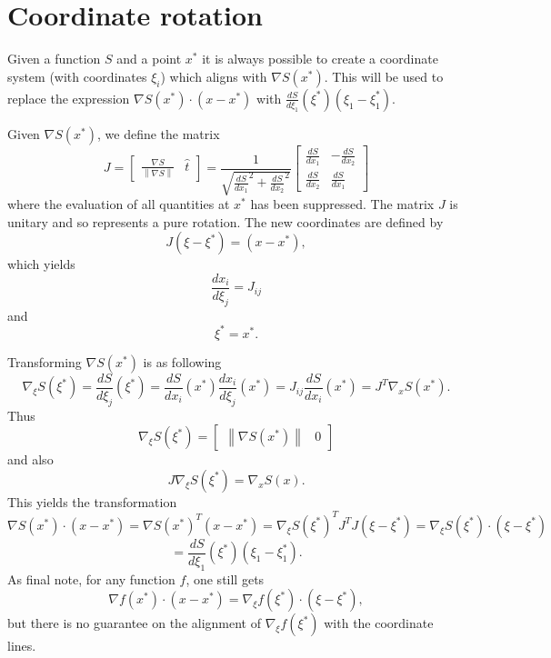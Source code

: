 \documentclass{article}
\newcommand{\norm}[1]{\left\lVert #1 \right\rVert}
\theoremstyle{plain}
\begin{document}
\section{Coordinate rotation}\label{sec_rotation}

Given a function $S$ and a point $x^*$ it is always possible to create a coordinate system (with coordinates $\xi_i$)
which aligns with $\nabla S(x^*)$.
This will be used to replace the expression $\nabla S(x^*)\cdot(x-x^*)$ with $\frac{dS}{d\xi_1}(\xi^*)(\xi_1-\xi_1^*)$.

Given $\nabla S(x^*)$, we define the matrix
\begin{equation}
	J =
	\begin{bmatrix}
		\frac{ \nabla S }{ \norm{\nabla S} } & \hat{t}
	\end{bmatrix}
	=
	\frac{1}{\sqrt{\frac{dS}{dx_1}^2 + \frac{dS}{dx_2}^2}}
	\begin{bmatrix}
		\frac{dS}{dx_1} & -\frac{dS}{dx_2} \\
		\frac{dS}{dx_2} & \frac{dS}{dx_1}
	\end{bmatrix}
\end{equation}
where the evaluation of all quantities at $x^*$ has been suppressed.
The matrix $J$ is unitary and so represents a pure rotation.
The new coordinates are defined by
\begin{equation}
	J(\xi-\xi^*) = (x-x^*),
\end{equation}
which yields
\begin{equation}
	\frac{dx_i}{d\xi_j} = J_{ij}
\end{equation}
and
\begin{equation}
	\xi^*=x^*.
\end{equation}

Transforming $\nabla S(x^*)$ is as following
\begin{equation}
	\nabla_\xi S(\xi^*) = \frac{dS}{d\xi_j}(\xi^*) = \frac{dS}{dx_i}(x^*)\frac{dx_i}{d\xi_j}(x^*) = J_{ij}\frac{dS}{dx_i}(x^*) = J^T\nabla_x S(x^*).
\end{equation}
Thus
\begin{equation}
	\nabla_\xi S(\xi^*) = 
	\begin{bmatrix}
		\norm{\nabla S(x^*)} & 0
	\end{bmatrix}
\end{equation}
and also
\begin{equation}
	J\nabla_\xi S(\xi^*) = \nabla_x S(x).
\end{equation}
This yields the transformation
\begin{equation*}
	\nabla S(x^*)\cdot(x-x^*) = \nabla S(x^*)^T(x-x^*) = \nabla_\xi S(\xi^*)^T J^T J(\xi-\xi^*) = \nabla_\xi S(\xi^*)\cdot(\xi-\xi^*)
\end{equation*}
\begin{equation}
	= \frac{dS}{d\xi_1}(\xi^*)(\xi_1-\xi_1^*).
\end{equation}
As final note, for any function $f$, one still gets
\begin{equation}
	\nabla f(x^*)\cdot(x-x^*) = \nabla_\xi f(\xi^*)\cdot(\xi-\xi^*),
\end{equation}
but there is no guarantee on the alignment of $\nabla_\xi f(\xi^*)$ with the coordinate lines.
\end{document}
